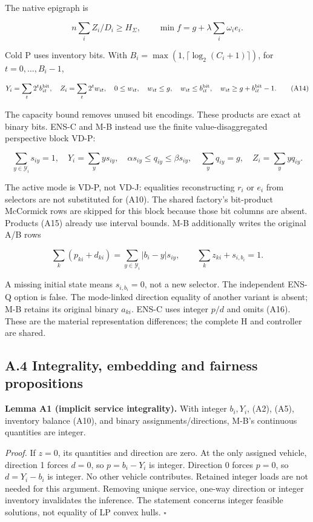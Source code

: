 \documentclass[
  american,
  11pt,
]{article}
\begin{document}
The native epigraph is

\[
n\sum_i Z_i/D_i\ge H_\Sigma,\qquad\min f=g+\lambda\sum_i\omega_i e_i.
\tag{A13}
\]

Cold P uses inventory bits. With
\(B_i=\max(1,\lceil\log_2(C_i+1)\rceil)\), for \(t=0,\ldots,B_i-1\),

\[
Y_i=\sum_t2^t b_{it}^{\rm bit},\quad Z_i=\sum_t2^t w_{it},\quad
0\le w_{it},\quad w_{it}\le g,\quad w_{it}\le b_{it}^{\rm bit},
\quad w_{it}\ge g+b_{it}^{\rm bit}-1.
\tag{A14}
\]

The capacity bound removes unused bit encodings. These products are
exact at binary bits. ENS-C and M-B instead use the finite
value-disaggregated perspective block VD-P:

\[
\sum_{y\in\mathcal Y_i}s_{iy}=1,\quad
Y_i=\sum_y y s_{iy},\quad
\alpha s_{iy}\le q_{iy}\le\beta s_{iy},\quad
\sum_yq_{iy}=g,\quad Z_i=\sum_y yq_{iy}.
\tag{A15}
\]

The active mode is VD-P, not VD-J: equalities reconstructing \(r_i\) or
\(e_i\) from selectors are not substituted for (A10). The shared
factory's bit-product McCormick rows are skipped for this block because
those bit columns are absent. Products (A15) already use interval
bounds. M-B additionally writes the original A/B rows

\[
\sum_k(p_{ki}+d_{ki})=\sum_{y\in\mathcal Y_i}|b_i-y|s_{iy},
\qquad \sum_kz_{ki}+s_{i,b_i}=1.
\tag{A16}
\]

A missing initial state means \(s_{i,b_i}=0\), not a new selector. The
independent ENS-Q option is false. The mode-linked direction equality of
another variant is absent; M-B retains its original binary \(a_{ki}\).
ENS-C uses integer \(p/d\) and omits (A16). These are the material
representation differences; the complete H and controller are shared.

\subsection{A.4 Integrality, embedding and fairness
propositions}\label{a.4-integrality-embedding-and-fairness-propositions}


\textbf{Lemma A1 (implicit service integrality).} With integer
\(b_i,Y_i\), (A2), (A5), inventory balance (A10), and binary
assignments/directions, M-B's continuous quantities are integer.

\emph{Proof.} If \(z=0\), its quantities and direction are zero. At the
only assigned vehicle, direction 1 forces \(d=0\), so \(p=b_i-Y_i\) is
integer. Direction 0 forces \(p=0\), so \(d=Y_i-b_i\) is integer. No
other vehicle contributes. Retained integer loads are not needed for
this argument. Removing unique service, one-way direction or integer
inventory invalidates the inference. The statement concerns integer
feasible solutions, not equality of LP convex hulls. \(\square\)
\end{document}
